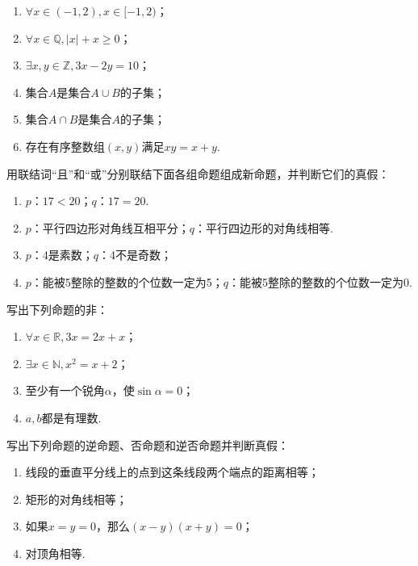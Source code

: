 \documentclass[lang=cn,math=cm,chinesefont=nofont,11pt,scheme=chinese,twocol]{elegantbook}
\begin{document}
\begin{enumerate}
  \item $\forall x\in(-1, 2), x\in[-1, 2)$；
  \item $\forall x\in\mathbb{Q}, |x|+x\geqslant0$；
  \item $\exists x,y\in\mathbb{Z},3x-2y=10$；
  \item 集合$A$是集合$A\cup B$的子集；
  \item 集合$A\cap B$是集合$A$的子集；
  \item 存在有序整数组$(x,y)$满足$xy=x+y$.
\end{enumerate}

\begin{exercise}
  用联结词“且”和“或”分别联结下面各组命题组成新命题，并判断它们的真假：
\end{exercise}

\begin{enumerate}
  \item $p$：$17<20$；$q$：$17=20$.
  \item $p$：平行四边形对角线互相平分；$q$：平行四边形的对角线相等.
  \item $p$：4是素数；$q$：4不是奇数；
  \item $p$：能被5整除的整数的个位数一定为5；$q$：能被5整除的整数的个位数一定为0.
\end{enumerate}

\begin{exercise}
  写出下列命题的非：
\end{exercise}

\begin{enumerate}
  \item $\forall x\in\mathbb{R},3x=2x+x$；
  \item $\exists x\in\mathbb{N},x^2=x+2$；
  \item 至少有一个锐角$\alpha$，使$\sin\alpha=0$；
  \item $a,b$都是有理数.
\end{enumerate}

\begin{exercise}
  写出下列命题的逆命题、否命题和逆否命题并判断真假：
\end{exercise}

\begin{enumerate}
  \item 线段的垂直平分线上的点到这条线段两个端点的距离相等；
  \item 矩形的对角线相等；
  \item 如果$x=y=0$，那么$(x-y)(x+y)=0$；
  \item 对顶角相等.
\end{enumerate}
\end{document}
